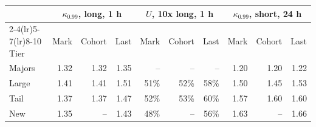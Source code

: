 \begin{tabular}{@{}lrrrrrrrrr@{}}
\toprule
 & \multicolumn{3}{c}{$\kappa_{0.99}$, long, 1 h} & \multicolumn{3}{c}{$U$, 10x long, 1 h} & \multicolumn{3}{c}{$\kappa_{0.99}$, short, 24 h} \\
\cmidrule(lr){2-4}\cmidrule(lr){5-7}\cmidrule(lr){8-10}
Tier & Mark & Cohort & Last & Mark & Cohort & Last & Mark & Cohort & Last \\
\midrule
Majors & 1.32 & 1.32 & 1.35 & -- & -- & -- & 1.20 & 1.20 & 1.22 \\
Large & 1.41 & 1.41 & 1.51 & 51\% & 52\% & 58\% & 1.50 & 1.45 & 1.53 \\
Tail & 1.37 & 1.37 & 1.47 & 52\% & 53\% & 60\% & 1.57 & 1.60 & 1.60 \\
New & 1.35 & -- & 1.43 & 48\% & -- & 56\% & 1.63 & -- & 1.66 \\
\bottomrule
\end{tabular}
